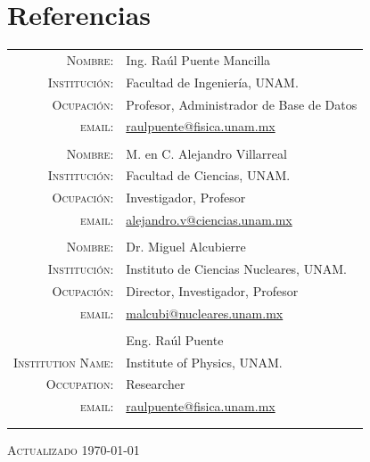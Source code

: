 \documentclass[a4paper,10pt]{article} %
\begin{document}
\section{Referencias}
\small
\begin{tabular}{rl}
	\textsc{Nombre:} & Ing. Raúl Puente Mancilla \\
	\textsc{Institución:} & Facultad de Ingeniería, UNAM.\\
	\textsc{Ocupación:} & Profesor, Administrador de Base de Datos\\
	\textsc{email:} & \href{mailto:raulpuente@fisica.unam.mx}{raulpuente@fisica.unam.mx}\\
	\multicolumn{2}{c}{} \\
	\textsc{Nombre:} & M. en C. Alejandro Villarreal \\
	\textsc{Institución:} & Facultad de Ciencias, UNAM.\\
	\textsc{Ocupación:} & Investigador, Profesor\\
	\textsc{email:} & \href{mailto:alejandro.v@ciencias.unam.mx}{alejandro.v@ciencias.unam.mx}\\
	\multicolumn{2}{c}{} \\	\textsc{Nombre:} & Dr. Miguel Alcubierre \\
	\textsc{Institución:} & Instituto de Ciencias Nucleares, UNAM.\\
	\textsc{Ocupación:} & Director, Investigador, Profesor\\
	\textsc{email:} & \href{mailto:malcubi@nucleares.unam.mx}{malcubi@nucleares.unam.mx}\\
	\multicolumn{2}{c}{} \\

\end{tabular}
\begin{center}
	\textsc{Actualizado \today}
\end{center}


\newpage
\end{document}
